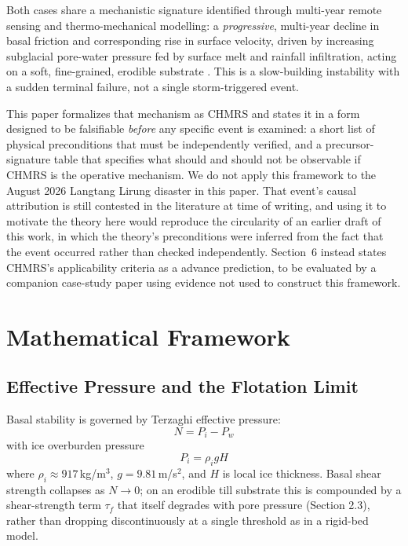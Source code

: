 \documentclass[11pt,twocolumn]{article}
\begin{document}
Both cases share a mechanistic signature identified through multi-year remote sensing and thermo-mechanical modelling: a \emph{progressive}, multi-year decline in basal friction and corresponding rise in surface velocity, driven by increasing subglacial pore-water pressure fed by surface melt and rainfall infiltration, acting on a soft, fine-grained, erodible substrate \cite{gilbert2018}. This is a slow-building instability with a sudden terminal failure, not a single storm-triggered event.

This paper formalizes that mechanism as CHMRS and states it in a form designed to be falsifiable \emph{before} any specific event is examined: a short list of physical preconditions that must be independently verified, and a precursor-signature table that specifies what should and should not be observable if CHMRS is the operative mechanism. We do not apply this framework to the August 2026 Langtang Lirung disaster in this paper. That event's causal attribution is still contested in the literature at time of writing, and using it to motivate the theory here would reproduce the circularity of an earlier draft of this work, in which the theory's preconditions were inferred from the fact that the event occurred rather than checked independently. Section~6 instead states CHMRS's applicability criteria as a advance prediction, to be evaluated by a companion case-study paper using evidence not used to construct this framework.

\section{Mathematical Framework}

\subsection{Effective Pressure and the Flotation Limit}
Basal stability is governed by Terzaghi effective pressure:
\begin{equation}
N = P_i - P_w
\end{equation}
with ice overburden pressure
\begin{equation}
P_i = \rho_i g H
\end{equation}
where $\rho_i \approx 917$\,kg/m$^3$, $g = 9.81$\,m/s$^2$, and $H$ is local ice thickness. Basal shear strength collapses as $N \to 0$; on an erodible till substrate this is compounded by a shear-strength term $\tau_f$ that itself degrades with pore pressure (Section 2.3), rather than dropping discontinuously at a single threshold as in a rigid-bed model.
\end{document}
